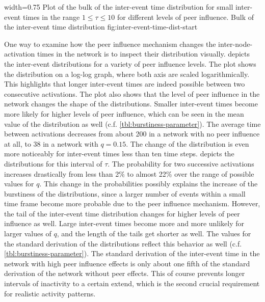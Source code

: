       {width=0.75\textwidth}
      {Plot of the bulk of the inter-event time distribution for small inter-event times in the range \( 1 \leq \tau \leq 10 \) for different levels of peer influence.}
      {Bulk of the inter-event time distribution}
      {fig:inter-event-time-dist-start}


One way to examine how the peer influence mechanism changes the inter-node-activation times in the network is to inspect their distribution visually.
 depicts the inter-event distributions for a variety of peer influence levels.
The plot shows the distribution on a log-log graph, where both axis are scaled logarithmically.
This highlights that longer inter-event times are indeed possible between two consecutive activations.
The plot also shows that the level of peer influence in the network changes the shape of the distributions.
Smaller inter-event times become more likely for higher levels of peer influence, which can be seen in the mean value of the distribution as well (c.f. \cref{tbl:burstiness-parameter}).
The average time between activations decreases from about 200 in a network with no peer influence at all, to 38 in a network with \( q = 0.15 \).
The change of the distribution is even more noticeably for inter-event times less than ten time steps.
 depicts the distributions for this interval of \( \tau \).
The probability for two successive activations increases drastically from less than 2\% to almost 22\% over the range of possible values for \( q \).
This change in the probabilities possibly explains the increase of the burstiness of the distributions, since a larger number of events within a small time frame become more probable due to the peer influence mechanism.
However, the tail of the inter-event time distribution changes for higher levels of peer influence as well.
Large inter-event times become more and more unlikely for larger values of \( q \), and the length of the tails get shorter as well.
The values for the standard derivation of the distributions reflect this behavior as well (c.f. \cref{tbl:burstiness-parameter}).
The standard derivation of the inter-event time in the network with high peer influence effects is only about one fifth of the standard derivation of the network without peer effects.
This of course prevents longer intervals of inactivity to a certain extend, which is the second crucial requirement for realistic activity patterns.




